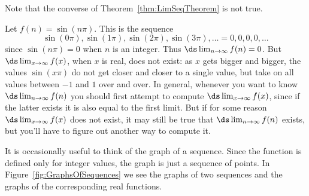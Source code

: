 Note that the converse of Theorem~\ref{thm:LimSeqTheorem} is not true.

Let $f(n)=\sin(n\pi)$. This is the sequence
\[
  \sin(0\pi), \sin(1\pi),\sin(2\pi),\sin(3\pi),\ldots=0,0,0,0,\ldots
\]
since $\sin(n\pi)=0$ when $n$ is an integer. Thus
$\ds \lim_{n\to\infty}f(n)=0$. But $\ds \lim_{x\to\infty}f(x)$, when $x$ is
real, does not exist: as $x$ gets bigger and bigger, the values
$\sin(x\pi)$ do not get closer and closer to a single value, but take
on all values between $-1$ and $1$ over and over. In general, whenever
you want to know $\ds \lim_{n\to\infty}f(n)$ you should first attempt to
compute $\ds \lim_{x\to\infty}f(x)$, since if the latter exists it is also
equal to the first limit. But if for some reason
$\ds \lim_{x\to\infty}f(x)$ does not exist, it may still be true that 
$\ds \lim_{n\to\infty}f(n)$ exists, but you'll have to figure out
another way to compute it.

It is occasionally useful to think of the graph of a sequence. Since
the function is defined only for integer values, the graph is just a
sequence of points. In Figure~\ref{fig:GraphsOfSequences} we see the
graphs of two sequences and the graphs of the corresponding real
functions.

